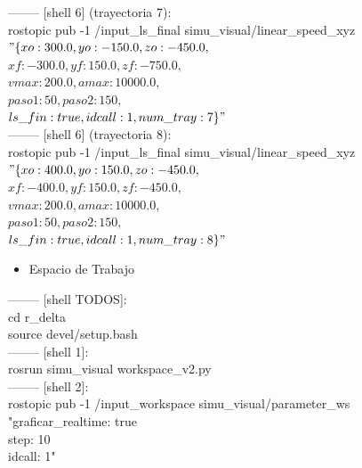-------- [shell 6] (trayectoria 7):\\
rostopic pub -1 /input\_ls\_final simu\_visual/linear\_speed\_xyz\\ 
$"\{xo: 300.0, yo: -150.0, zo: -450.0,$\\
$xf: -300.0, yf: 150.0, zf: -750.0,$\\
$vmax: 200.0, amax: 10000.0,$\\
$paso1: 50,  paso2: 150,$\\
$ls\_fin: true, idcall: 1, num\_tray: 7\}"$\\
-------- [shell 6] (trayectoria 8):\\
rostopic pub -1 /input\_ls\_final simu\_visual/linear\_speed\_xyz\\ 
$"\{xo: 400.0, yo: 150.0, zo: -450.0,$\\
$xf: -400.0, yf: 150.0, zf: -450.0,$\\
$vmax: 200.0, amax: 10000.0,$\\
$paso1: 50,  paso2: 150,$\\
$ls\_fin: true, idcall: 1, num\_tray: 8\}"$\\

    \begin{itemize}
        \item Espacio de Trabajo
    \end{itemize}
-------- [shell TODOS]:\\
cd r\_delta\\
source devel/setup.bash\\
-------- [shell 1]:\\
rosrun simu\_visual workspace\_v2.py\\
-------- [shell 2]:\\
rostopic pub -1 /input\_workspace simu\_visual/parameter\_ws "graficar\_realtime: true\\
step: 10\\
idcall: 1"\\

    
    
    
    
    
    
    \newpage
    
